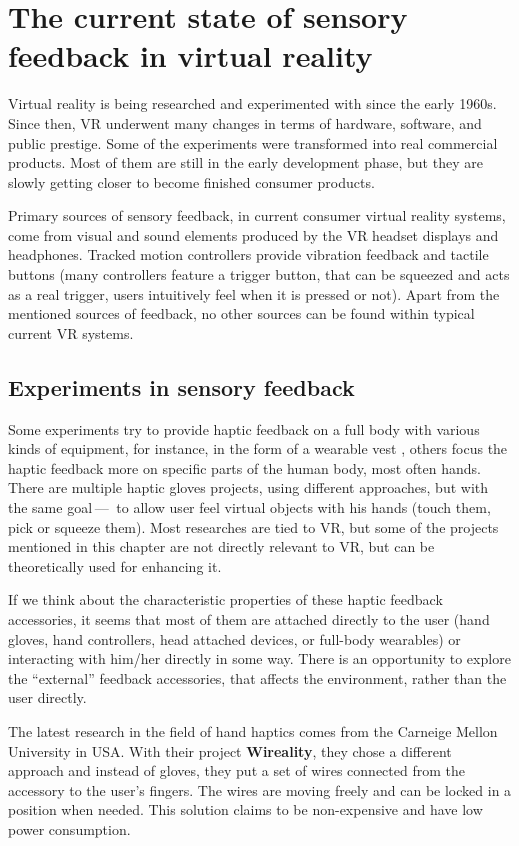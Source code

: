 \chapter{The current state of sensory feedback in virtual reality}

Virtual reality is being researched and experimented with since the early 1960s.
\cite{vrhistory} Since then, VR underwent many changes in terms of hardware,
software, and public prestige.
Some of the experiments were transformed into real commercial products.
Most of them are still in the early development phase, but they are slowly getting
closer to become finished consumer products.


Primary sources of sensory feedback, in current consumer virtual reality systems,
come from visual and sound elements produced by the VR headset displays and
headphones. Tracked
motion controllers provide vibration feedback and tactile buttons (many 
controllers feature a trigger button, that can be squeezed and acts as
a real trigger, users intuitively feel when it is pressed or not).
Apart from the mentioned sources of feedback, no other sources can be found
within typical current VR systems.


\section{Experiments in sensory feedback}
Some experiments try to provide haptic feedback on a full body with various
kinds of equipment, for instance, in the form of a wearable vest \cite{tfbhf},
others focus the haptic feedback more on specific parts of the
human body, most often hands. \cite{haptgloves} There are multiple haptic gloves 
projects, using different approaches, but with the same goal — 
to allow user feel virtual objects with his hands
(touch them, pick or squeeze them). Most researches are tied to VR,
but some of the projects mentioned in this chapter are not directly relevant
to VR, but can be theoretically used for enhancing it.

If we think about the characteristic properties of these haptic feedback
accessories, it seems that most of them are attached directly to the
user (hand gloves, hand controllers, head attached devices, or full-body wearables)
or interacting with him/her directly in some way. There is an opportunity to explore
the ``external'' feedback accessories, that affects the environment, rather than
the user directly.

The latest research in the field of hand haptics comes from the Carneige Mellon
University in USA. With their project \textbf{Wireality}, they chose a different
approach and instead of gloves, they put a set of wires connected from the
accessory to the user’s fingers. \cite{wireality} The wires are moving freely 
and can be locked in a position when needed. This solution claims to be 
non-expensive and have low power consumption. 


